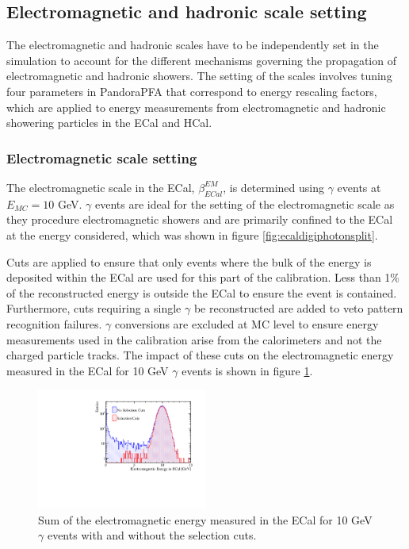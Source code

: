 \subsection{Electromagnetic and hadronic scale setting}
\label{sec:scalesetting}
The electromagnetic and hadronic scales have to be independently set in the simulation to account for the different mechanisms governing the propagation of electromagnetic and hadronic showers.  The setting of the scales involves tuning four parameters in PandoraPFA that correspond to energy rescaling factors, which are applied to energy measurements from electromagnetic and hadronic showering particles in the ECal and HCal.  


\subsubsection{Electromagnetic scale setting}
\label{sec:emscalesetting}
The electromagnetic scale in the ECal, $\beta^{EM}_{ECal}$, is determined using $\gamma$ events at $E_{MC} = 10$ GeV.  $\gamma$ events are ideal for the setting of the electromagnetic scale as they procedure electromagnetic showers and are primarily confined to the ECal at the energy considered, which was shown in figure \ref{fig:ecaldigiphotonsplit}.  

Cuts are applied to ensure that only events where the bulk of the energy is deposited within the ECal are used for this part of the calibration.  Less than 1\% of the reconstructed energy is outside the ECal to ensure the event is contained.  Furthermore, cuts requiring a single $\gamma$ be reconstructed are added to veto pattern recognition failures.  $\gamma$ conversions are excluded at MC level to ensure energy measurements used in the calibration arise from the calorimeters and not the charged particle tracks.  The impact of these cuts on the electromagnetic energy measured in the ECal for 10 GeV $\gamma$ events is shown in figure \ref{fig:ecalemscaleselection}.

\begin{figure}
\includegraphics[width=0.5\textwidth]{EnergyEstimators/Plots/Calibration/EMScaleSetting/EMScaleECalSelection.pdf}
\caption[Sum of the electromagnetic energy measured in the ECal for 10 GeV $\gamma$ events with and without the selection cuts.]{Sum of the electromagnetic energy measured in the ECal for 10 GeV $\gamma$ events with and without the selection cuts.}
\label{fig:ecalemscaleselection}
\end{figure}

